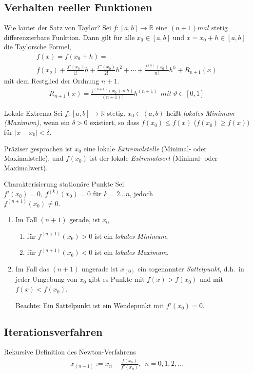 \subsection{Verhalten reeller Funktionen}

\begin{karte}{Wie lautet der Satz von Taylor?}
	Sei $f:[a,b] \to \mathbb{R}$ eine $(n+1)mal$ stetig differenzierbare Funktion. Dann gilt für alle $x_0 \in [a,b]$ und $x=x_0 + h \in [a,b]$ die Taylorsche Formel,
	\begin{multline}
		f(x)=f(x_0+h)=\\ f(x_o) + \frac{f'(x_0)}{1!}h + \frac{f''(x_0)}{2!}h^2 +  \cdots+\frac{f^{(n)}(x_0)}{n!}h^n + R_{n+1}(x)
	\end{multline}
	mit dem Restglied der Ordnung $n+1$.\vspace{2.5mm}
	\begin{align}
		R_{n+1}(x) = \frac{f^{(n+1)}(x_0 + \vartheta\ h)}{(n+1)!}h^{(n+1)} \ \ mit \ \vartheta \in [0,1] 
	\end{align}
	
\end{karte}

\begin{karte}{Lokale Extrema}
	Sei \(f:[a,b]\to\mathbb{R}\) stetig. \(x_0 \in (a,b)\) heißt \emph{lokales Minimum (Maximum)}, wenn ein \(\delta > 0\) existiert, so dass \(f(x_0)\leq f(x)\) (\(f(x_0)\geq f(x)) \) für \(\lvert x-x_0\rvert < \delta \).\par
	Präziser gesprochen ist \(x_0\) eine lokale \emph{Extremalstelle} (Minimal- oder Maximalstelle), und \(f(x_0)\) ist der lokale \emph{Extremalwert} (Minimal- oder Maximalwert).
\end{karte}

\begin{karte}{Charakterisierung stationäre Punkte}
	Sei \(f'(x_0)=0,\ f^{(k)}(x_0)=0 \text{ für } k=2\dots n \), jedoch \\ \(f^{(n+1)} (x_0) \neq 0\).
	\begin{enumerate}[label=\(\triangleright \)]
		\item Im Fall \((n+1)\) gerade, ist \(x_0\)
		      \begin{enumerate}[label=--]
		      	\item für \( f^{(n+1)}(x_0)>0 \) ist ein \emph{lokales Minimum},
		      	\item für \( f^{(n+1)}(x_0)<0 \) ist ein \emph{lokales Maximum}.
		      \end{enumerate}
		\item Im Fall das \( (n+1) \) ungerade ist \(x_{(0)}\) ein sogenannter \emph{Sattelpunkt}, d.h.\ in jeder Umgebung von \(x_0\) gibt es Punkte mit \(f(x)>f(x_0)\) und mit \(f(x)<f(x_0)\).\vspace{5mm}\par
		      Beachte: Ein Sattelpunkt ist ein Wendepunkt mit \(f'(x_0)=0\).
	\end{enumerate}
\end{karte}
\subsection{Iterationsverfahren}
\begin{karte}{Rekursive Definition des Newton-Verfahrens}
	\begin{align}
		x_{(n+1)}:=x_{n}-\frac{f(x_n)}{f'(x_n)},\ \ n=0,1,2,\dots 
	\end{align}
\end{karte}
